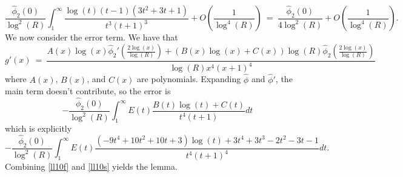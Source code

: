 \documentclass[11pt, reqno]{amsart}
\makeatletter
\renewenvironment{proof}[1][\proofname]{\par
  \vspace{-.7\topsep}%
  \pushQED{\qed}%
  \normalfont
  \topsep0pt \partopsep0pt %
  \trivlist
  \item[\hskip\labelsep
        \itshape
    #1\@addpunct{.}]\ignorespaces
}{%
  \popQED\endtrivlist\@endpefalse
  \addvspace{6pt plus 6pt} %
}
\theoremstyle{definition}
\theoremstyle{remark}
\numberwithin{equation}{section}
\renewcommand{\hat}{\widehat}
\makeatother
\begin{document}
\begin{proof}
    \begin{equation}
        \frac{\hat\phi_2(0)}{\log^2(R)}\int_1^\infty \frac{\log(t) (t-1)(3t^2+3t+1)}{t^3(t+1)^3}+O\left(\frac{1}{\log^4(R)}\right)\ =\ \frac{\hat\phi_2(0)}{4\log^2(R)}+O\left(\frac{1}{\log^4(R)}\right).
        \label{ll10f}
    \end{equation}
    We now consider the error term. We have that 
    \begin{equation}
        g'(x)\ =\ \frac{A(x)\log(x) \hat\phi_2'\left(\frac{2\log(x)}{\log(R)}\right)+(B(x)\log(x)+C(x))\log(R) \hat\phi_2\left(\frac{2\log(x)}{\log(R)}\right)}{\log(R)x^4(x+1)^4}
    \end{equation}
    where $A(x)$, $B(x)$, and $C(x)$ are polynomials. Expanding $\hat\phi$ and $\hat\phi'$, the main term doesn't contribute, so the error is
    \begin{equation}
    -\frac{\hat\phi_2(0)}{\log^2(R)}\int_1^\infty E(t)\frac{B(t)\log(t)+C(t)}{t^4(t+1)}dt
    \end{equation}
    which is explicitly
    \begin{equation}
        -\frac{\hat\phi_2(0)}{\log^2(R)}\int_1^\infty E(t)\frac{(-9t^4+10t^2+10t+3)\log(t)+3t^4+3t^3-2t^2-3t-1}{t^4(t+1)^4}dt.
        \label{ll10s}
    \end{equation}
    Combining \eqref{ll10f} and \eqref{ll10s} yields the lemma.
\end{proof}

\printbibliography
\end{document}
